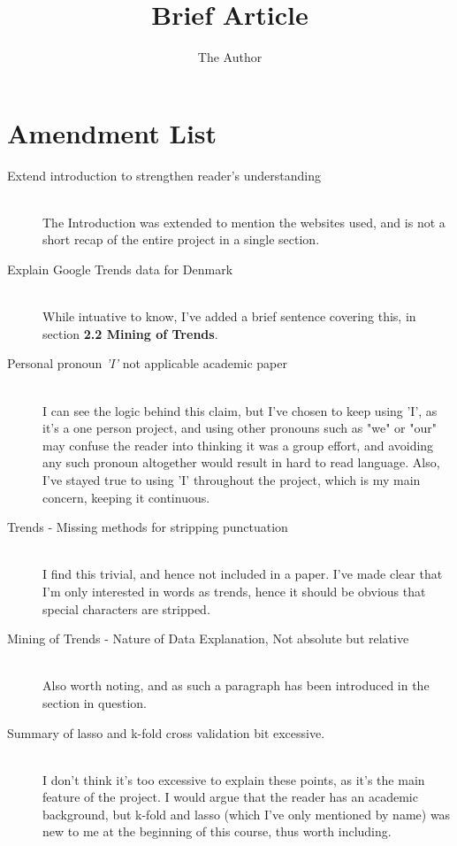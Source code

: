 \documentclass[11pt]{report} %
\title{Brief Article}
\author{The Author}
\begin{document}
\tableofcontents
\newpage





\section*{Amendment List}
\begin{description}
\item[Extend introduction to strengthen reader's understanding]\hfill\\{The Introduction was extended to mention the websites used, and is not a short recap of the entire project in a single section.}
\item[Explain Google Trends data for Denmark]\hfill\\{While intuative to know, I've added a brief sentence covering this, in section \textbf{2.2 Mining of Trends}.}
\item[Personal pronoun \textit{'I'} not applicable academic paper]\hfill\\{I can see the logic behind this claim, but I've chosen to keep using 'I', as it's a one person project, and using other pronouns such as "we" or "our" may confuse the reader into thinking it was a group effort, and avoiding any such pronoun altogether would result in hard to read language. Also, I've stayed true to using 'I' throughout the project, which is my main concern, keeping it continuous.}
\item[Trends - Missing methods for stripping punctuation]\hfill\\{I find this trivial, and hence not included in a paper. I've made clear that I'm only interested in words as trends, hence it should be obvious that special characters are stripped.}
\item[Mining of Trends - Nature of Data Explanation, Not absolute but relative]\hfill\\{Also worth noting, and as such a paragraph has been introduced in the section in question.}
\item[Summary of lasso and k-fold cross validation bit excessive.]\hfill\\{I don't think it's too excessive to explain these points, as it's the main feature of the project. I would argue that the reader has an academic background, but k-fold and lasso (which I've only mentioned by name) was new to me at the beginning of this course, thus worth including.}

\end{description}
\end{document}
